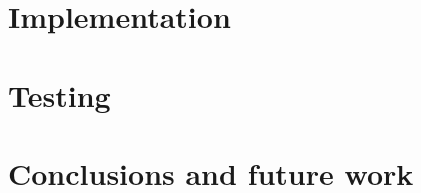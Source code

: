 \documentclass[a4paper,twoside,12pt]{book}
\renewcommand{\chaptermark}[1]{\markboth{#1}{#1}}
\begin{document}
\chapter{Implementation}

    

\chapter{Testing}

    

\chapter{Conclusions and future work}

    
    
    
%
    

\clearpage  %
\printbibliography

\newpage %
\appendix %


\end{document}
